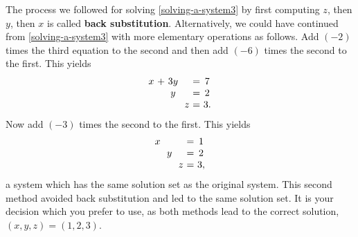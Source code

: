 \begin{solution}
  The process we followed for solving \eqref{solving-a-system3} by first
  computing $z$, then $y$, then $x$ is called \textbf{back
    substitution}.  Alternatively, we could
  have continued from \eqref{solving-a-system3} with more elementary
  operations as follows. Add $(-2) $ times the third
  equation to the second and then add $(-6) $ times the
  second to the first. This yields
  \begin{equation*}
    \allowbreak
    \begin{array}{c@{~}c@{~}c@{~}c@{~}c@{~}c@{~}c}
      x&+&3y&&&=&7 \\
      &&y&&&=&2 \\
      &&&&z&=&3.
    \end{array}
  \end{equation*}
  Now add $(-3) $ times the second to the first. This yields
  \begin{equation*}
    \allowbreak
    \begin{array}{c@{~}c@{~}c@{~}c@{~}c@{~}c@{~}c}
      x&&&&&=&1 \\
      &&y&&&=&2 \\
      &&&&z&=&3,
    \end{array}
  \end{equation*}
  a system which has the same solution set as the original
  system. This second method avoided back substitution and led to the
  same solution set. It is your decision which you prefer to use, as
  both methods lead to the correct solution,
  $(x,y,z) = (1,2,3)$.
\end{solution}

